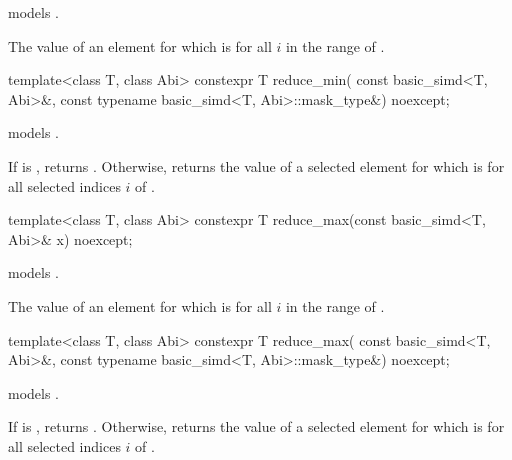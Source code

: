 \begin{itemdescr}
\pnum
\constraints
{} models .

\pnum
\returns
The value of an element  for which  is
 for all $i$ in the range of .
\end{itemdescr}

\begin{itemdecl}
template<class T, class Abi>
  constexpr T reduce_min(
    const basic_simd<T, Abi>&, const typename basic_simd<T, Abi>::mask_type&) noexcept;
\end{itemdecl}

\begin{itemdescr}
\pnum
\constraints
{} models .

\pnum
\returns
If  is , returns
.
Otherwise, returns the value of a selected element  for which
 is  for all selected indices $i$ of
.
\end{itemdescr}

\begin{itemdecl}
template<class T, class Abi> constexpr T reduce_max(const basic_simd<T, Abi>& x) noexcept;
\end{itemdecl}

\begin{itemdescr}
\pnum
\constraints
{} models .

\pnum
\returns
The value of an element  for which  is
 for all $i$ in the range of .
\end{itemdescr}

\begin{itemdecl}
template<class T, class Abi>
  constexpr T reduce_max(
    const basic_simd<T, Abi>&, const typename basic_simd<T, Abi>::mask_type&) noexcept;
\end{itemdecl}

\begin{itemdescr}
\pnum
\constraints
{} models .

\pnum
\returns
If  is , returns
.
Otherwise, returns the value of a selected element  for which
 is  for all selected indices $i$ of
.
\end{itemdescr}

